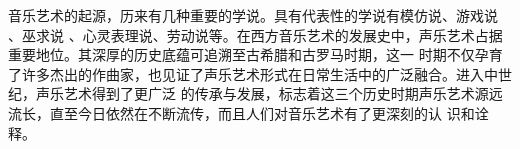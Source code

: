 \begin{chineseabstract}
    音乐艺术的起源，历来有几种重要的学说。具有代表性的学说有模仿说、游戏说 、巫求说 、心灵表理说、劳动说等。在西方音乐艺术的发展史中，声乐艺术占据重要地位。其深厚的历史底蕴可追溯至古希腊和古罗马时期，这一
    时期不仅孕育了许多杰出的作曲家，也见证了声乐艺术形式在日常生活中的广泛融合。进入中世纪，声乐艺术得到了更广泛
    的传承与发展，标志着这三个历史时期声乐艺术源远流长，直至今日依然在不断流传，而且人们对音乐艺术有了更深刻的认
    识和诠释。
    
\end{chineseabstract}